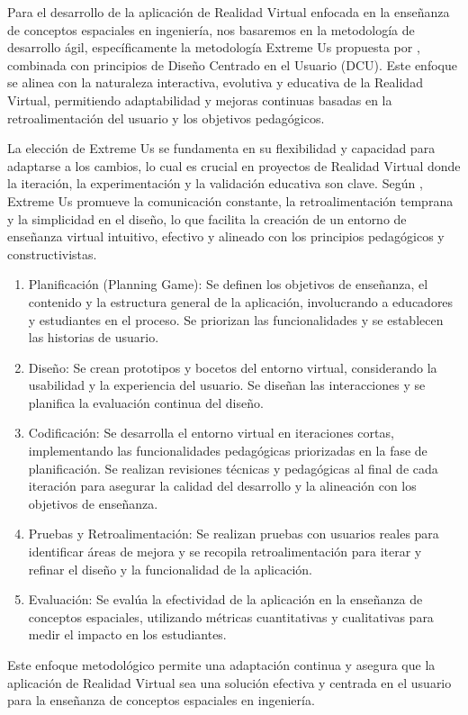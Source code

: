 Para el desarrollo de la aplicación de Realidad Virtual enfocada en la enseñanza de conceptos espaciales en ingeniería, nos basaremos en la metodología de desarrollo ágil, específicamente la metodología Extreme Us propuesta por \citeauthor{fuenmayor} \citeyear{fuenmayor}, combinada con principios de Diseño Centrado en el Usuario (DCU). Este enfoque se alinea con la naturaleza interactiva, evolutiva y educativa de la Realidad Virtual, permitiendo adaptabilidad y mejoras continuas basadas en la retroalimentación del usuario y los objetivos pedagógicos.

La elección de Extreme Us se fundamenta en su flexibilidad y capacidad para adaptarse a los cambios, lo cual es crucial en proyectos de Realidad Virtual donde la iteración, la experimentación y la validación educativa son clave. Según \citeauthor{fuenmayor} \citeyear{fuenmayor}, Extreme Us promueve la comunicación constante, la retroalimentación temprana y la simplicidad en el diseño, lo que facilita la creación de un entorno de enseñanza virtual intuitivo, efectivo y alineado con los principios pedagógicos y constructivistas.

\begin{enumerate}
  \item Planificación (Planning Game): Se definen los objetivos de enseñanza, el contenido y la estructura general de la aplicación, involucrando a educadores y estudiantes en el proceso. Se priorizan las funcionalidades y se establecen las historias de usuario.
  \item Diseño: Se crean prototipos y bocetos del entorno virtual, considerando la usabilidad y la experiencia del usuario. Se diseñan las interacciones y se planifica la evaluación continua del diseño.
  \item Codificación: Se desarrolla el entorno virtual en iteraciones cortas, implementando las funcionalidades pedagógicas priorizadas en la fase de planificación. Se realizan revisiones técnicas y pedagógicas al final de cada iteración para asegurar la calidad del desarrollo y la alineación con los objetivos de enseñanza.
  \item Pruebas y Retroalimentación: Se realizan pruebas con usuarios reales para identificar áreas de mejora y se recopila retroalimentación para iterar y refinar el diseño y la funcionalidad de la aplicación.
  \item Evaluación: Se evalúa la efectividad de la aplicación en la enseñanza de conceptos espaciales, utilizando métricas cuantitativas y cualitativas para medir el impacto en los estudiantes.
\end{enumerate}

Este enfoque metodológico permite una adaptación continua y asegura que la aplicación de Realidad Virtual sea una solución efectiva y centrada en el usuario para la enseñanza de conceptos espaciales en ingeniería.

\clearpage
